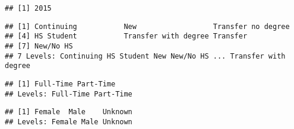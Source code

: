 \documentclass[]{article}
\newenvironment{Shaded}{\begin{snugshade}}{\end{snugshade}}
\newcommand{\KeywordTok}[1]{\textcolor[rgb]{0.13,0.29,0.53}{\textbf{#1}}}
\newcommand{\OperatorTok}[1]{\textcolor[rgb]{0.81,0.36,0.00}{\textbf{#1}}}
\newcommand{\NormalTok}[1]{#1}
\begin{document}
\begin{Shaded}
\end{Shaded}

\begin{verbatim}
## [1] 2015
\end{verbatim}

\begin{Shaded}
\end{Shaded}

\begin{verbatim}
## [1] Continuing           New                  Transfer no degree  
## [4] HS Student           Transfer with degree Transfer            
## [7] New/No HS           
## 7 Levels: Continuing HS Student New New/No HS ... Transfer with degree
\end{verbatim}

\begin{Shaded}
\end{Shaded}

\begin{verbatim}
## [1] Full-Time Part-Time
## Levels: Full-Time Part-Time
\end{verbatim}

\begin{Shaded}
\end{Shaded}

\begin{verbatim}
## [1] Female  Male    Unknown
## Levels: Female Male Unknown
\end{verbatim}

\begin{Shaded}
\end{Shaded}
\end{document}
